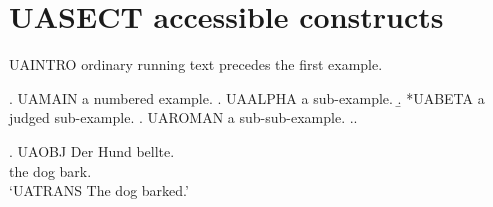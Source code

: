 
\section{UASECT accessible constructs}

UAINTRO ordinary running text precedes the first example.

\ex.\label{ua:one} UAMAIN a numbered example.
\a. UAALPHA a sub-example.
\b. *UABETA a judged sub-example.
\a. UAROMAN a sub-sub-example.
\z.\z.

\exg. UAOBJ Der Hund bellte.\\ the dog bark.\\
\glt `UATRANS The dog barked.'

